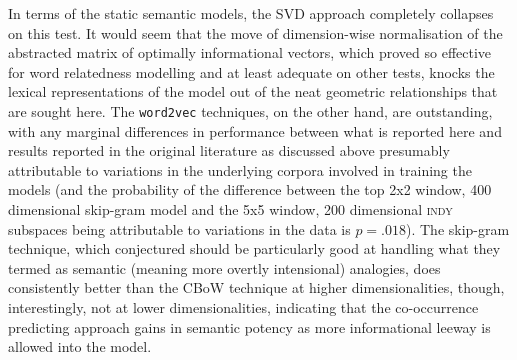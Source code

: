 In terms of the static semantic models, the SVD approach completely collapses on this test.  It would seem that the move of dimension-wise normalisation of the abstracted matrix of optimally informational vectors, which proved so effective for word relatedness modelling and at least adequate on other tests, knocks the lexical representations of the model out of the neat geometric relationships that are sought here.  The \texttt{word2vec} techniques, on the other hand, are outstanding, with any marginal differences in performance between what is reported here and results reported in the original literature as discussed above presumably attributable to variations in the underlying corpora involved in training the models (and the probability of the difference between the top 2x2 window, 400 dimensional skip-gram model and the 5x5 window, 200 dimensional \textsc{indy} subspaces being attributable to variations in the data is $p = .018$).  The skip-gram technique, which \cite{MikolovEA2013} conjectured should be particularly good at handling what they termed as semantic (meaning more overtly intensional) analogies, does consistently better than the CBoW technique at higher dimensionalities, though, interestingly, not at lower dimensionalities, indicating that the co-occurrence predicting approach gains in semantic potency as more informational leeway is allowed into the model.

